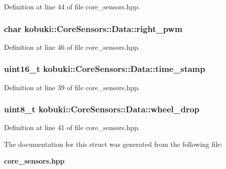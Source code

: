 \-Definition at line 44 of file core\-\_\-sensors.\-hpp.

\subsubsection[{right\-\_\-pwm}]{\setlength{\rightskip}{0pt plus 5cm}char {\bf kobuki\-::\-Core\-Sensors\-::\-Data\-::right\-\_\-pwm}}\label{structkobuki_1_1CoreSensors_1_1Data_a7a32588b92f15eff9cef99ebe2d600b2}


\-Definition at line 46 of file core\-\_\-sensors.\-hpp.

\subsubsection[{time\-\_\-stamp}]{\setlength{\rightskip}{0pt plus 5cm}uint16\-\_\-t {\bf kobuki\-::\-Core\-Sensors\-::\-Data\-::time\-\_\-stamp}}\label{structkobuki_1_1CoreSensors_1_1Data_a2ef0c11257ef7a25c0691e87659e138b}


\-Definition at line 39 of file core\-\_\-sensors.\-hpp.

\subsubsection[{wheel\-\_\-drop}]{\setlength{\rightskip}{0pt plus 5cm}uint8\-\_\-t {\bf kobuki\-::\-Core\-Sensors\-::\-Data\-::wheel\-\_\-drop}}\label{structkobuki_1_1CoreSensors_1_1Data_a47fa534f8b8da4ef4dfed6ecdaa9e2e5}


\-Definition at line 41 of file core\-\_\-sensors.\-hpp.



\-The documentation for this struct was generated from the following file\-:\begin{DoxyCompactItemize}
\item 
{\bf core\-\_\-sensors.\-hpp}\end{DoxyCompactItemize}
